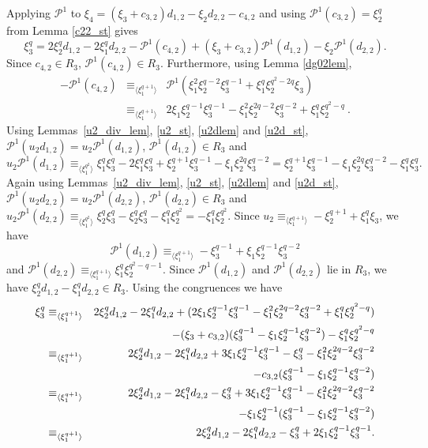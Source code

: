 \documentclass{amsart}
\newcommand{\PP}{\mathcal{P}}
\begin{document}
Applying $\PP^1$ to $\xi_4=(\xi_3+c_{3,2})d_{1,2}-\xi_2d_{2,2}-c_{4,2}$ and using $\PP^1(c_{3,2})=\xi_2^q$ from Lemma \ref{c22_st} gives
 $$\xi_3^q=2\xi_2^q d_{1,2}-2\xi_1^q d_{2,2}-\PP^1(c_{4,2})+(\xi_3+c_{3,2})\PP^1(d_{1,2})-\xi_2\PP^1(d_{2,2}).$$
 Since $c_{4,2}\in R_3$, $\PP^1(c_{4,2})\in R_3$. Furthermore, using Lemma \ref{dg02lem},
\begin{eqnarray*}
    -\PP^1(c_{4,2})&\equiv_{\langle \xi_1^{q+1}\rangle}&
    \PP^1(\xi_1^2\xi_2^{q-2}\xi_3^{q-1}+\xi_1^q\xi_2^{q^2-2q}\xi_3)\\
    &\equiv_{\langle \xi_1^{q+1}\rangle}& 
    2\xi_1\xi_2^{q-1}\xi_3^{q-1}-\xi_1^2\xi_2^{2q-2}\xi_3^{q-2}+\xi_1^q\xi_2^{q^2-q}\ .
\end{eqnarray*}
 Using Lemmas~\ref{u2_div_lem}, \ref{u2_st}, \ref{u2dlem} and \ref{u2d_st}, $\PP^1(u_2d_{1,2})=u_2\PP^1(d_{1,2})$, $\PP^1(d_{1,2})\in R_3$ and
 $$u_2\PP^1(d_{1,2})\equiv_{\langle \xi_1^{q^2}\rangle}\xi_1^q\xi_3^q-2\xi_1^q\xi_3^q+\xi_2^{q+1}\xi_3^{q-1}-\xi_1\xi_2^{2q}\xi_3^{q-2}
 =\xi_2^{q+1}\xi_3^{q-1}-\xi_1\xi_2^{2q}\xi_3^{q-2}-\xi_1^q\xi_3^q.$$
 Again using Lemmas~\ref{u2_div_lem}, \ref{u2_st}, \ref{u2dlem} and \ref{u2d_st}, $\PP^1(u_2d_{2,2})=u_2\PP^1(d_{2,2})$, $\PP^1(d_{2,2})\in R_3$ and
 $u_2\PP^1(d_{2,2})\equiv_{\langle \xi_1^{q^2}\rangle}\xi_2^q\xi_3^q-\xi_2^q\xi_3^q-\xi_1^q\xi_2^{q^2}=-\xi_1^q\xi_2^{q^2}$. 
 Since $u_2\equiv_{\langle \xi_1^{q+1}\rangle} -\xi_2^{q+1}+\xi_1^q\xi_3$, we have
 $$\PP^1(d_{1,2})\equiv_{\langle \xi_1^{q+1}\rangle}  - \xi_3^{q-1}+\xi_1\xi_2^{q-1}\xi_3^{q-2}$$ and $\PP^1(d_{2,2})\equiv_{\langle \xi_1^{q+1}\rangle} \xi_1^q\xi_2^{q^2-q-1}$.
 Since $\PP^1(d_{1,2})$ and $\PP^1(d_{2,2})$ lie in $R_3$, we have
 $\xi_2^q d_{1,2}-\xi_1^q d_{2,2}\in R_3$.
 Using the congruences we have
  \begin{eqnarray*}
 \xi_3^q&\equiv_{\langle \xi_1^{q+1}\rangle}& 2\xi_2^q d_{1,2}-2\xi_1^q d_{2,2}+
 (2\xi_1\xi_2^{q-1}\xi_3^{q-1}-\xi_1^2\xi_2^{2q-2}\xi_3^{q-2}+\xi_1^q\xi_2^{q^2-q})\cr
  &&-(\xi_3+c_{3,2})(\xi_3^{q-1}-\xi_1\xi_2^{q-1}\xi_3^{q-2})-\xi_1^q\xi_2^{q^2-q}\cr
 &\equiv_{\langle \xi_1^{q+1}\rangle}&2\xi_2^q d_{1,2}-2\xi_1^q d_{2,2}
 +3\xi_1\xi_2^{q-1}\xi_3^{q-1}-\xi_3^q
 -\xi_1^2\xi_2^{2q-2}\xi_3^{q-2}\cr
 &&-c_{3,2}(\xi_3^{q-1}-\xi_1\xi_2^{q-1}\xi_3^{q-2}) \cr
 &\equiv_{\langle \xi_1^{q+1}\rangle}&2\xi_2^q d_{1,2}-2\xi_1^q d_{2,2}-\xi_3^q+3\xi_1\xi_2^{q-1}\xi_3^{q-1}-\xi_1^2\xi_2^{2q-2}\xi_3^{q-2} \cr
 &&-\xi_1\xi_2^{q-1}(\xi_3^{q-1}-\xi_1\xi_2^{q-1}\xi_3^{q-2})\cr
 &\equiv_{\langle \xi_1^{q+1}\rangle}&2\xi_2^q d_{1,2}-2\xi_1^q d_{2,2}-\xi_3^q +2\xi_1\xi_2^{q-1}\xi_3^{q-1}.
 \end{eqnarray*}
\end{document}

